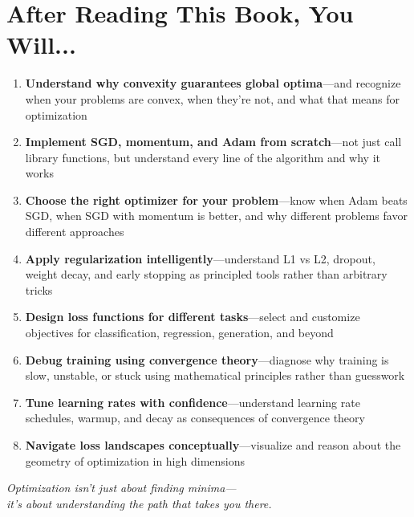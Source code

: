 \documentclass[../main.tex]{subfiles}
\begin{document}
\chapter*{After Reading This Book, You Will...}
\thispagestyle{empty}

\begin{enumerate}[leftmargin=*, itemsep=1em]
    \item \textbf{Understand why convexity guarantees global optima}---and recognize when your problems are convex, when they're not, and what that means for optimization

    \item \textbf{Implement SGD, momentum, and Adam from scratch}---not just call library functions, but understand every line of the algorithm and why it works

    \item \textbf{Choose the right optimizer for your problem}---know when Adam beats SGD, when SGD with momentum is better, and why different problems favor different approaches

    \item \textbf{Apply regularization intelligently}---understand L1 vs L2, dropout, weight decay, and early stopping as principled tools rather than arbitrary tricks

    \item \textbf{Design loss functions for different tasks}---select and customize objectives for classification, regression, generation, and beyond

    \item \textbf{Debug training using convergence theory}---diagnose why training is slow, unstable, or stuck using mathematical principles rather than guesswork

    \item \textbf{Tune learning rates with confidence}---understand learning rate schedules, warmup, and decay as consequences of convergence theory

    \item \textbf{Navigate loss landscapes conceptually}---visualize and reason about the geometry of optimization in high dimensions
\end{enumerate}

\vfill

\begin{center}
\textit{Optimization isn't just about finding minima---\\it's about understanding the path that takes you there.}
\end{center}

\cleardoublepage
\end{document}
